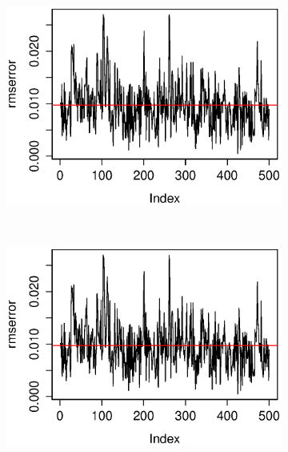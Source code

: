 \documentclass[a4paper,11pt]{article}
\begin{document}
\begin{figure}[H]
    \begin{subfigure}[b]{0.4\textwidth}
            \includegraphics[width=\textwidth]{rmserror8.eps}
    \end{subfigure}
    ~
    \begin{subfigure}[b]{0.4\textwidth}
            \includegraphics[width=\textwidth]{rmserror9.eps}
    \end{subfigure}
    

\end{figure}
\end{document}
